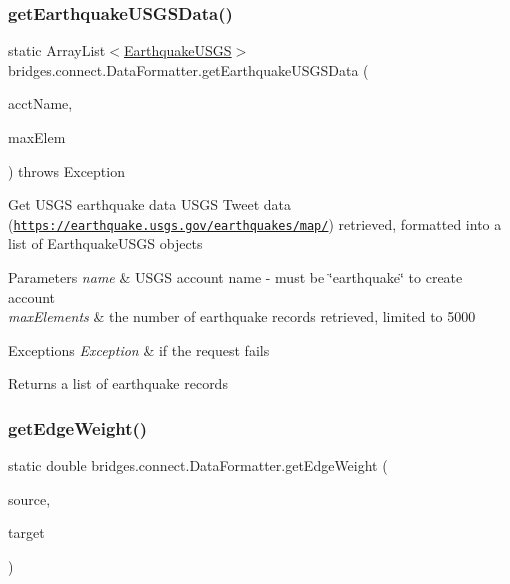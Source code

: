 \subsubsection{\texorpdfstring{get\+Earthquake\+U\+S\+G\+S\+Data()}{getEarthquakeUSGSData()}}
{\footnotesize\ttfamily static Array\+List$<$\hyperlink{classbridges_1_1data__src__dependent_1_1_earthquake_u_s_g_s}{Earthquake\+U\+S\+GS}$>$ bridges.\+connect.\+Data\+Formatter.\+get\+Earthquake\+U\+S\+G\+S\+Data (\begin{DoxyParamCaption}\item[{\hyperlink{classbridges_1_1data__src__dependent_1_1_u_s_g_saccount}{U\+S\+G\+Saccount}}]{acct\+Name,  }\item[{int}]{max\+Elem }\end{DoxyParamCaption}) throws Exception\hspace{0.3cm}{\ttfamily [static]}}

Get U\+S\+GS earthquake data U\+S\+GS Tweet data (\href{https://earthquake.usgs.gov/earthquakes/map/}{\tt https\+://earthquake.\+usgs.\+gov/earthquakes/map/}) retrieved, formatted into a list of Earthquake\+U\+S\+GS objects


\begin{DoxyParams}{Parameters}
{\em name} & U\+S\+GS account name -\/ must be \char`\"{}earthquake\char`\"{} to create account \\
\hline
{\em max\+Elements} & the number of earthquake records retrieved, limited to 5000 \\
\hline
\end{DoxyParams}

\begin{DoxyExceptions}{Exceptions}
{\em Exception} & if the request fails\\
\hline
\end{DoxyExceptions}
\begin{DoxyReturn}{Returns}
a list of earthquake records 
\end{DoxyReturn}
\hypertarget{classbridges_1_1connect_1_1_data_formatter_a2637c733e7f4efccfb56de0940506318}{}\label{classbridges_1_1connect_1_1_data_formatter_a2637c733e7f4efccfb56de0940506318} 
\subsubsection{\texorpdfstring{get\+Edge\+Weight()}{getEdgeWeight()}}
{\footnotesize\ttfamily static double bridges.\+connect.\+Data\+Formatter.\+get\+Edge\+Weight (\begin{DoxyParamCaption}\item[{String}]{source,  }\item[{String}]{target }\end{DoxyParamCaption})\hspace{0.3cm}{\ttfamily [static]}}

